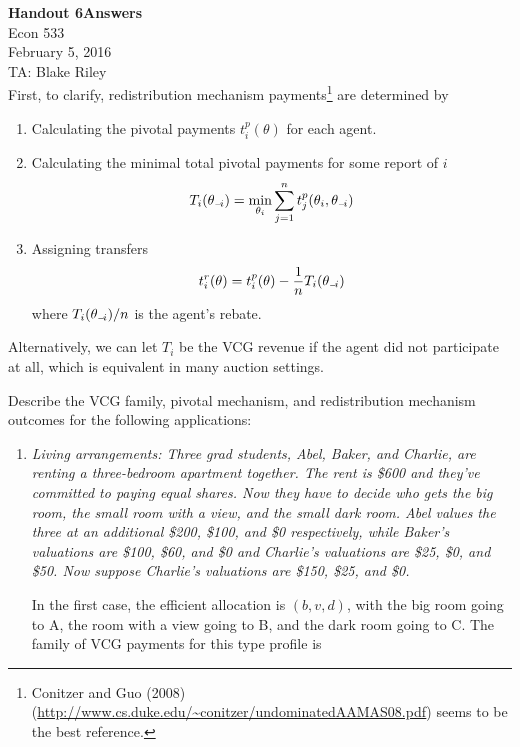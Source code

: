 \documentclass[10pt]{article}
\def\HandoutNumber{6}
\def\TheDate{February 5, 2016}
\def\Name{Blake Riley}
\begin{document}
\begin{spacing}{1.0}

\noindent
\textbf{Handout \HandoutNumber Answers} \\
Econ 533 \\
\TheDate \\
TA: \Name \\

First, to clarify, redistribution mechanism payments\footnote{Conitzer and
  Guo (2008)
  (\url{http://www.cs.duke.edu/~conitzer/undominatedAAMAS08.pdf}) seems to
  be the best reference.} are determined by
  \begin{enumerate}
  \item Calculating the pivotal payments $t_i^p(\theta)$ for each agent.
  \item Calculating the minimal total pivotal payments for some report of
    $i$
    \begin{align*}
      T_i(\theta_{{\scriptscriptstyle-}\!i}) = \min_{\theta_i} \sum_{j=1}^n t_j^p(\theta_i, \theta_{{\scriptscriptstyle-}\!i})
    \end{align*}
  \item Assigning transfers
    \begin{align*}
      t_i^r(\theta) = t_i^p(\theta) - \frac{1}{n} T_i(\theta_{{\scriptscriptstyle-}\!i})
    \end{align*}
    where $T_i(\theta_{{\scriptscriptstyle-}\!i})/n$ is the agent's rebate.
  \end{enumerate}
  Alternatively, we can let $T_i$ be the VCG revenue if the agent did not
  participate at all, which is equivalent in many auction settings.

\vspace{1em}
\noindent
  Describe the VCG family, pivotal mechanism, and redistribution mechanism
outcomes for the following applications:
  \begin{enumerate}
  \item \textit{Living arrangements: Three grad students, Abel, Baker, and
      Charlie, are renting a three-bedroom apartment together. The rent is
      \$600 and they've committed to paying equal shares. Now they have to
      decide who gets the big room, the small room with a view, and the
      small dark room. Abel values the three at an additional \$200,
      \$100, and \$0 respectively, while Baker's valuations are \$100,
      \$60, and \$0 and Charlie's valuations are \$25, \$0, and \$50. Now
      suppose Charlie's valuations are \$150, \$25, and \$0.}

  In the first case, the efficient allocation is $(b, v, d)$, with the big
  room going to A, the room with a view going to B, and the dark room
  going to C. The family of VCG payments for this type profile is


\end{enumerate}
\end{spacing}
\end{document}
